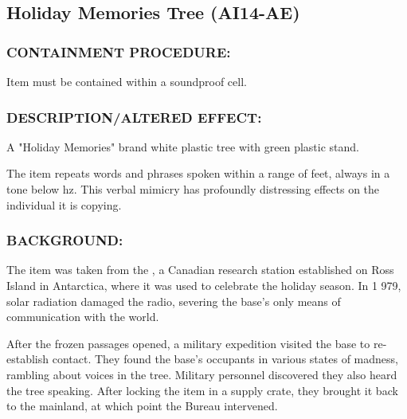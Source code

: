 \subsection*{Holiday Memories Tree (AI14-AE)}
\subsubsection*{CONTAINMENT PROCEDURE:}
\par Item must be contained within a
soundproof cell.
\subsubsection*{DESCRIPTION/ALTERED EFFECT:}
\par A "Holiday Memories" brand white plastic
tree with green plastic stand.
\par The item repeats words and phrases
spoken within a range of 
feet, always in a tone below hz. This verbal mimicry has profoundly distressing effects
on the individual it is copying.
\subsubsection*{BACKGROUND:}
\par The item was taken from the ,
a Canadian research
station established on Ross Island in Antarctica, where it was
used to celebrate the holiday season. In 1 979, solar radiation
damaged the radio, severing the base's only means of
communication with the world.
\par After the frozen passages opened, a military expedition visited the
base to re-establish contact. They found the base's occupants in
various states of madness, rambling about voices in the tree.
Military personnel discovered they also heard the tree speaking.
After locking the item in a supply crate, they brought it back to the
mainland, at which point the Bureau intervened.